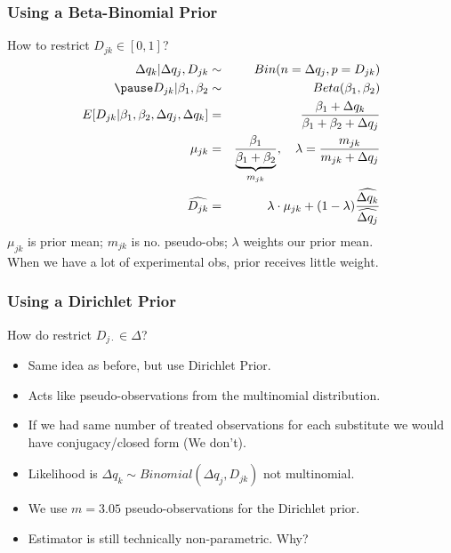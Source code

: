\documentclass[aspectratio=169]{beamer}
\begin{document}
\begin{frame}
\frametitle{Using a Beta-Binomial Prior}
How to restrict $D_{jk} \in [0,1]$?
\begin{eqnarray*}
\Delta q_k | \Delta q_j,D_{jk} &\sim& Bin(n=\Delta q_j, p=D_{jk})\\ \pause
 D_{jk} | \beta_1, \beta_2 &\sim& Beta(\beta_1,\beta_2)\\
E[D_{jk} | \beta_1, \beta_2, \Delta q_j, \Delta q_k] &=& \frac{\beta_1 + \Delta q_k}{\beta_1 + \beta_2 + \Delta q_j}\\ \mu_{jk} &=& \frac{\beta_1}{\underbrace{\beta_1+\beta_2}_{m_{jk}}},  \quad \lambda = \frac{m_{jk}}{m_{jk} + \Delta q_j} \\
\widehat{D_{jk}} &=& \lambda \cdot \mu_{jk} + (1-\lambda) \frac{\widehat{\Delta q_k}}{\widehat{\Delta q_j}}
\end{eqnarray*}
$\mu_{jk}$ is prior mean; $m_{jk}$ is no. pseudo-obs; $\lambda$ weights our prior mean. \\%
When we have a lot of experimental obs, prior receives little weight.
\end{frame}

\begin{frame}
\frametitle{Using a Dirichlet Prior}
How do restrict $D_{j\cdot} \in \Delta$?
\begin{itemize}
\item Same idea as before, but use \alert{Dirichlet Prior}.
\item Acts like pseudo-observations from the \alert{multinomial} distribution.
\item If we had same number of treated observations for each substitute we would have conjugacy/closed form (We don't).
\item Likelihood is $\Delta q_{k} \sim Binomial(\Delta q_j, D_{jk})$ not \alert{multinomial}.
\item We use $m=3.05$ pseudo-observations for the Dirichlet prior.
\item Estimator is still technically \alert{non-parametric}. Why?
\end{itemize}
\end{frame}
\end{document}
